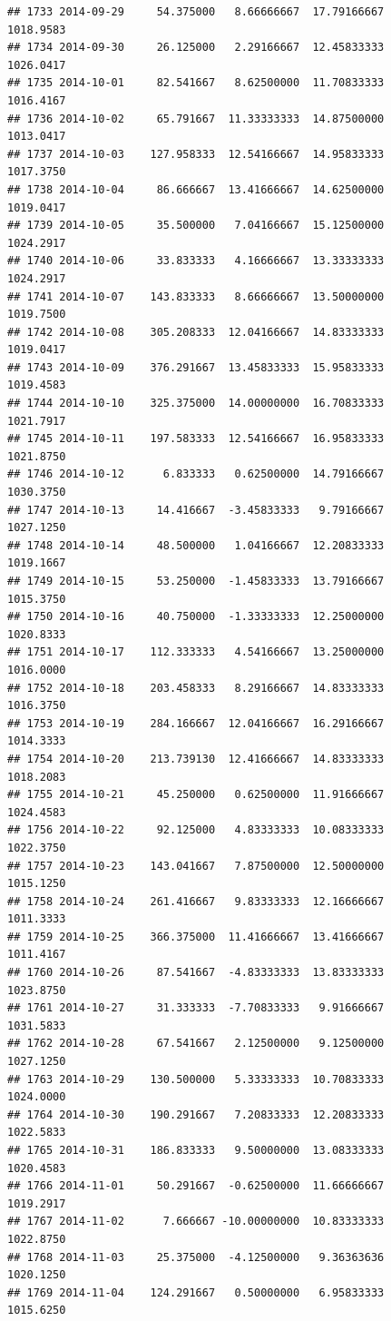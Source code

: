 \documentclass[
]{article}
\begin{document}
\begin{verbatim}
## 1733 2014-09-29     54.375000   8.66666667  17.79166667    1018.9583
## 1734 2014-09-30     26.125000   2.29166667  12.45833333    1026.0417
## 1735 2014-10-01     82.541667   8.62500000  11.70833333    1016.4167
## 1736 2014-10-02     65.791667  11.33333333  14.87500000    1013.0417
## 1737 2014-10-03    127.958333  12.54166667  14.95833333    1017.3750
## 1738 2014-10-04     86.666667  13.41666667  14.62500000    1019.0417
## 1739 2014-10-05     35.500000   7.04166667  15.12500000    1024.2917
## 1740 2014-10-06     33.833333   4.16666667  13.33333333    1024.2917
## 1741 2014-10-07    143.833333   8.66666667  13.50000000    1019.7500
## 1742 2014-10-08    305.208333  12.04166667  14.83333333    1019.0417
## 1743 2014-10-09    376.291667  13.45833333  15.95833333    1019.4583
## 1744 2014-10-10    325.375000  14.00000000  16.70833333    1021.7917
## 1745 2014-10-11    197.583333  12.54166667  16.95833333    1021.8750
## 1746 2014-10-12      6.833333   0.62500000  14.79166667    1030.3750
## 1747 2014-10-13     14.416667  -3.45833333   9.79166667    1027.1250
## 1748 2014-10-14     48.500000   1.04166667  12.20833333    1019.1667
## 1749 2014-10-15     53.250000  -1.45833333  13.79166667    1015.3750
## 1750 2014-10-16     40.750000  -1.33333333  12.25000000    1020.8333
## 1751 2014-10-17    112.333333   4.54166667  13.25000000    1016.0000
## 1752 2014-10-18    203.458333   8.29166667  14.83333333    1016.3750
## 1753 2014-10-19    284.166667  12.04166667  16.29166667    1014.3333
## 1754 2014-10-20    213.739130  12.41666667  14.83333333    1018.2083
## 1755 2014-10-21     45.250000   0.62500000  11.91666667    1024.4583
## 1756 2014-10-22     92.125000   4.83333333  10.08333333    1022.3750
## 1757 2014-10-23    143.041667   7.87500000  12.50000000    1015.1250
## 1758 2014-10-24    261.416667   9.83333333  12.16666667    1011.3333
## 1759 2014-10-25    366.375000  11.41666667  13.41666667    1011.4167
## 1760 2014-10-26     87.541667  -4.83333333  13.83333333    1023.8750
## 1761 2014-10-27     31.333333  -7.70833333   9.91666667    1031.5833
## 1762 2014-10-28     67.541667   2.12500000   9.12500000    1027.1250
## 1763 2014-10-29    130.500000   5.33333333  10.70833333    1024.0000
## 1764 2014-10-30    190.291667   7.20833333  12.20833333    1022.5833
## 1765 2014-10-31    186.833333   9.50000000  13.08333333    1020.4583
## 1766 2014-11-01     50.291667  -0.62500000  11.66666667    1019.2917
## 1767 2014-11-02      7.666667 -10.00000000  10.83333333    1022.8750
## 1768 2014-11-03     25.375000  -4.12500000   9.36363636    1020.1250
## 1769 2014-11-04    124.291667   0.50000000   6.95833333    1015.6250

\end{verbatim}
\end{document}
